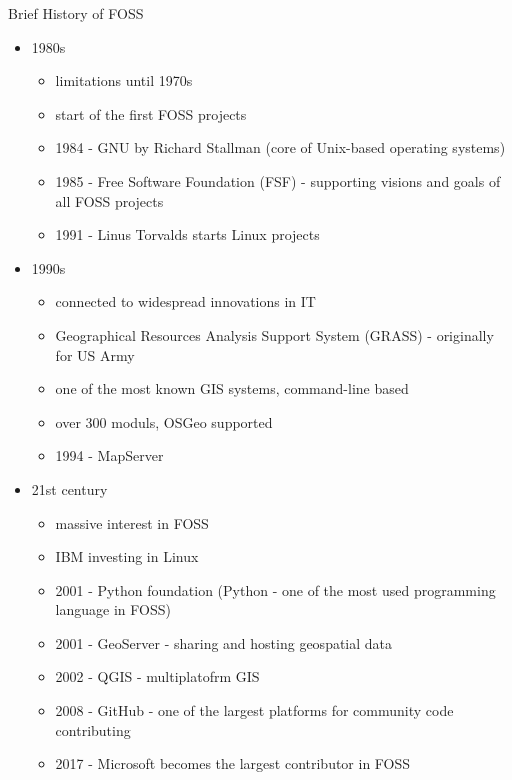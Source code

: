 \documentclass{beamer}
\begin{document}
        \begin{frame}[allowframebreaks]{Brief History of FOSS}
            \begin{itemize}
                \item 1980s 
                    \begin{itemize}
                        \item limitations until 1970s
                        \item start of the first FOSS projects
                        \item 1984 - GNU by Richard Stallman (core of Unix-based operating systems)
                        \item 1985 - Free Software Foundation (FSF) - supporting visions and goals of all FOSS projects
                        \item 1991 - Linus Torvalds starts Linux projects
                    \end{itemize}

                \item 1990s 
                    \begin{itemize}
                        \item connected to widespread innovations in IT
                        \item Geographical Resources Analysis Support System (GRASS) - originally for US Army
                        \item one of the most known GIS systems, command-line based
                        \item over 300 moduls, OSGeo supported
                        \item 1994 - MapServer
                    \end{itemize}

                \item 21st century 
                    \begin{itemize}
                        \item massive interest in FOSS
                        \item IBM investing in Linux 
                        \item 2001 - Python foundation (Python - one of the most used programming language in FOSS)
                        \item 2001 - GeoServer - sharing and hosting geospatial data
                        \item 2002 - QGIS - multiplatofrm GIS
                        \item 2008 - GitHub - one of the largest platforms for community code contributing
                        \item 2017 - Microsoft becomes the largest contributor in FOSS
                    \end{itemize}
            \end{itemize}
        \end{frame}
\end{document}
